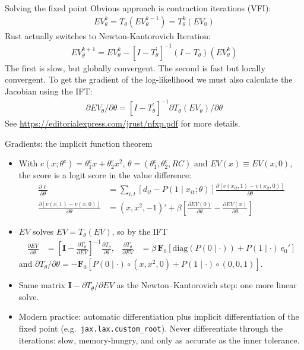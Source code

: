 \documentclass[aspectratio=169,11pt]{beamer}
\begin{document}
\begin{frame}{Solving the fixed point}
Obvious approach is contraction iterations (VFI):
\begin{align*}
E V_{\theta}^{k}=T_{\theta}\left(E V_{\theta}^{k-1}\right)=T_{\theta}^{k}\left(E V_{0}\right)
\end{align*}
Rust actually switches to Newton-Kantorovich Iteration:
\begin{align*}
E V_{\theta}^{k+1}=E V_{\theta}^{k}-\left[I-T_{\theta}^{\prime}\right]^{-1}\left(I-T_{\theta}\right)\left(E V_{\theta}^{k}\right)
\end{align*}
The first is slow, but globally convergent. The second is fast but locally convergent. To get the gradient of the log-likelihood we must also calculate the Jacobian using the IFT:
\begin{align*}
\partial E V_{\theta} / \partial \theta=\left[I-T_{\theta}^{\prime}\right]^{-1} \partial T_{\theta}\left(E V_{\theta}\right) / \partial \theta
\end{align*}
See \url{https://editorialexpress.com/jrust/nfxp.pdf} for more details.
\end{frame}

\begin{frame}{Gradients: the implicit function theorem}
\footnotesize
\begin{itemize}
\item With $c(x;\theta^c) = \theta^c_1 x + \theta^c_2 x^2$, $\theta = (\theta^c_1, \theta^c_2, RC)$ and $EV(x) \equiv EV(x,0)$, the score is a logit score in the value difference:
\begin{align*}
\frac{\partial \ell}{\partial \theta} &= \sum_{i,t} \left[d_{it} - P(1 \mid x_{it};\theta)\right] \frac{\partial \left[v(x_{it},1) - v(x_{it},0)\right]}{\partial \theta}\\
\frac{\partial \left[v(x,1) - v(x,0)\right]}{\partial \theta} &= (x, x^2, -1)' + \beta \left[\frac{\partial EV(0)}{\partial \theta} - \frac{\partial EV(x)}{\partial \theta}\right]
\end{align*}
\item $EV$ solves $EV = T_\theta(EV)$, so by the IFT
\begin{align*}
\frac{\partial EV}{\partial \theta} &= \left[\symbf{I} - \frac{\partial T_\theta}{\partial EV}\right]^{-1} \frac{\partial T_\theta}{\partial \theta}, &
\frac{\partial T_\theta}{\partial EV} &= \beta\, \symbf{F}_0 \left[\mathrm{diag}\left(P(0 \mid \cdot)\right) + P(1 \mid \cdot)\, e_0' \right]
\end{align*}
and $\partial T_\theta/\partial \theta = -\symbf{F}_0 \left[ P(0\mid\cdot) \circ (x, x^2, 0) + P(1 \mid \cdot) \circ (0,0,1) \right]$.
\item Same matrix $\symbf{I} - \partial T_\theta/\partial EV$ as the Newton--Kantorovich step: one more linear solve.
\item Modern practice: automatic differentiation plus \alert{implicit differentiation} of the fixed point (e.g.\ \texttt{jax.lax.custom\_root}). Never differentiate through the iterations: slow, memory-hungry, and only as accurate as the inner tolerance.
\end{itemize}
\end{frame}
\end{document}
